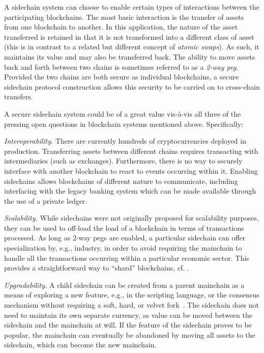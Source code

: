A sidechain system can choose to enable certain types of interactions between
the participating block\-chains. The most basic interaction
is the transfer of assets from
one blockchain to another. In this application, the nature of the asset
transferred is retained in that it is not transformed into a different class of
asset (this is in contrast to a related but different concept of \emph{atomic
swaps}).
As such, it maintains its value and may also be transferred back.
The ability to move assets back and
forth between two chains is sometimes referred to as a \textit{2-way peg}. Provided
the two chains are both secure as individual blockchains, a secure
sidechain protocol construction allows this security to be carried on to
cross-chain transfers.

A secure sidechain system could be of a great value vis-\`a-vis all three
of the pressing open questions in blockchain systems mentioned above. Specifically:

{\em Interoperability.} There are currently hundreds of
    cryptocurrencies deployed in production. Transferring assets between
    different chains requires transacting with intermediaries (such as exchanges). Furthermore,
    there is no way to securely interface with another blockchain to react to
    events occurring within it. Enabling sidechains allows
    blockchains of different nature to communicate, including interfacing with
    the legacy banking system which can be made available through the use of
    a private ledger.

{\em   Scalability.} While sidechains were not originally proposed for
    scalability purposes, they can be used to off-load the load of a blockchain
    in terms of transactions processed. As long as 2-way pegs are enabled, a
    particular sidechain can offer specialization by, e.g., industry, in order
    to avoid requiring the mainchain to handle all the transactions occurring
    within a particular economic sector. This provides a straightforward way to
    ``shard'' blockchains, cf. \cite{DBLP:conf/ccs/LuuNZBGS16,SP:KJGGSF18,EPRINT:ZamMovRay18}.

{\em Upgradability.} A child sidechain can be created from a parent
    mainchain as a means of exploring a new feature, e.g., in the scripting language, or
    the consensus mechanism
    without requiring a soft, hard, or velvet fork~\cite{nipopows,velvet}. The
    sidechain does not need to maintain its own separate currency, as value can
    be moved between the sidechain and the mainchain at will. If the feature of
    the sidechain proves to be popular, the mainchain can eventually be
    abandoned by moving all assets to the sidechain, which can become the new
    mainchain.

